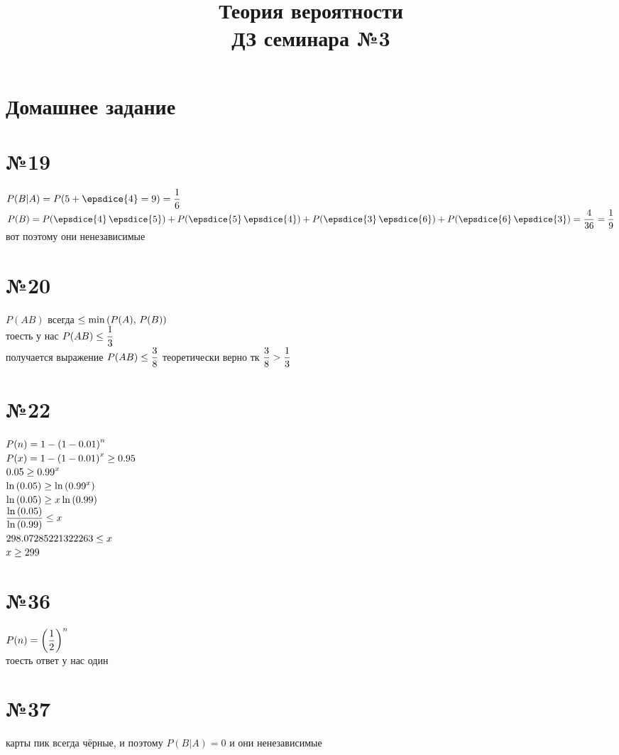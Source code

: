 \documentclass{article}
\title{Теория вероятности \\ ДЗ семинара №3}
\newcommand{\hr}{\par\vspace{.5\baselineskip}\noindent\hrulefill\par}
\begin{document}
  \maketitle

  \hr
  \section*{Домашнее задание}
  \section*{№19}
  $\ds P(B|A) = P(5 + \epsdice{4} = 9) = \f{1}{6} $ \\
  $\ds P(B) = P(\epsdice{4}\,\epsdice{5}) + P(\epsdice{5}\,\epsdice{4}) + P(\epsdice{3}\,\epsdice{6}) + P(\epsdice{6}\,\epsdice{3})
  = \f{4}{36} = \f{1}{9} $ \\
  вот поэтому они ненезависимые

  \section*{№20}
  $P(AB)$ всегда $\leq \min\left(P(A),\, P(B)\right)$ \\
  тоесть у нас $\displaystyle P(AB) \leq \frac{1}{3}$ \\
  получается выражение $\displaystyle P(AB) \leq \frac{3}{8}$ теоретически верно тк $\displaystyle \frac{3}{8} > \frac{1}{3}$

  \section*{№22}
  $\displaystyle P(n) = 1-\left(1-0.01\right)^n$ \\
  $\displaystyle P(x) = 1-\left(1-0.01\right)^x \geq 0.95$ \\
  $\displaystyle 0.05 \geq 0.99^x $ \\
  $\displaystyle \ln\left(0.05\right) \geq \ln\left(0.99^x\right) $ \\
  $\displaystyle \ln\left(0.05\right) \geq x\ln\left(0.99\right) $ \\
  $\displaystyle \frac{\ln\left(0.05\right)}{\ln\left(0.99\right)} \leq x $ \\
  $\displaystyle 298.07285221322263 \leq x $ \\
  $\displaystyle x \geq 299 $

  \section*{№36}
  $\displaystyle P(n) = \left(\frac{1}{2}\right)^n$ \\
  тоесть ответ у нас один

  \section*{№37}
  карты пик всегда чёрные, и поэтому $P(B|A) = 0$ и они ненезависимые
\end{document}
